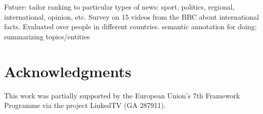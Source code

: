 \documentclass{llncs}
\begin{document}
Future: tailor ranking to particular types of news: sport, politics, regional, international, opinion, etc. Survey on 15 videos from the BBC about international facts. Evaluated over people in different countries.
semantic annotation for doing: summarizing topics/entities



\section*{Acknowledgments}
This work was partially supported by the European Union's 7th Framework Programme via the project LinkedTV (GA 287911).



\end{document}
